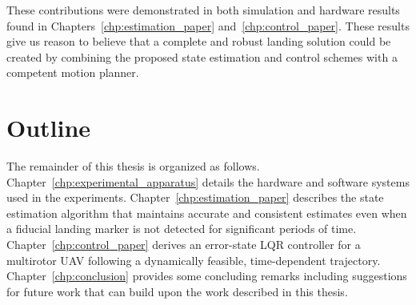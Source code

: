 These contributions were demonstrated in both simulation and hardware
results found in Chapters~\ref{chp:estimation_paper}
and~\ref{chp:control_paper}. These results give us reason to believe that a
complete and robust landing solution could be created by combining the proposed
state estimation and control schemes with a competent motion planner.

\section{Outline}

The remainder of this thesis is organized as follows.
Chapter~\ref{chp:experimental_apparatus} details the hardware and software
systems used
in the experiments. Chapter~\ref{chp:estimation_paper} describes the state
estimation algorithm that maintains accurate and consistent estimates even when
a fiducial landing marker is not detected for significant periods of time.
Chapter~\ref{chp:control_paper} derives an error-state LQR controller for a
multirotor UAV following a dynamically feasible, time-dependent trajectory.
Chapter~\ref{chp:conclusion} provides some concluding remarks including
suggestions for future work that can build upon the work described in this
thesis.
